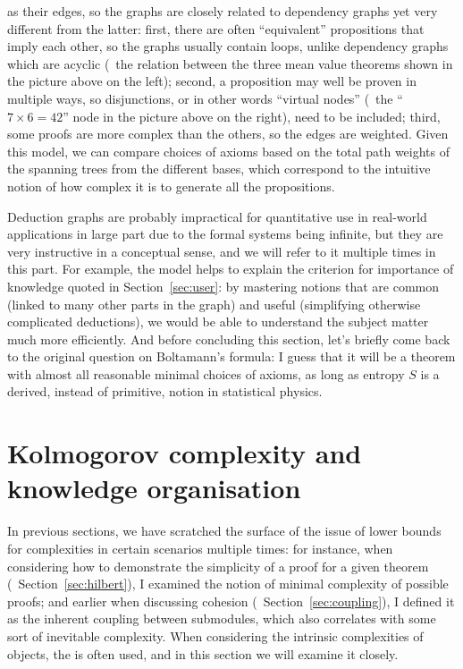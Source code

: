 as their edges, so the graphs are closely related to dependency graphs yet very
different from the latter: first, there are often ``equivalent'' propositions
that imply each other, so the graphs usually contain loops, unlike dependency
graphs which are acyclic (\cf~the relation between the three mean value theorems
shown in the picture above on the left); second, a proposition may well be
proven in multiple ways, so disjunctions, or in other words ``virtual nodes''
(\eg~the ``$7 \times 6 = 42$'' node in the picture above on the right),
need to be included; third, some proofs are more complex than the others,
so the edges are weighted.  Given this model, we can compare choices
of axioms based on the total path weights of the spanning trees from
the different bases, which correspond to the intuitive notion of
how complex it is to generate all the propositions.

Deduction graphs are probably impractical for quantitative use in real-world
applications in large part due to the formal systems being infinite, but they
are very instructive in a conceptual sense, and we will refer to it multiple
times in this part.  For example, the model helps to explain the criterion
for importance of knowledge quoted in Section~\ref{sec:user}: by mastering
notions that are common (linked to many other parts in the graph) and useful
(simplifying otherwise complicated deductions), we would be able to
understand the subject matter much more efficiently.  And before concluding
this section, let's briefly come back to the original question on Boltamann's
formula: I guess that it will be a theorem with almost all reasonable
minimal choices of axioms, as long as entropy $S$ is a derived,
instead of primitive, notion in statistical physics.

\section{Kolmogorov complexity and knowledge organisation}\label{sec:kolmogorov}

In previous sections, we have scratched the surface of the issue of lower
bounds for complexities in certain scenarios multiple times: for instance,
when considering how to demonstrate the simplicity of a proof for a given
theorem (\cf~Section~\ref{sec:hilbert}), I examined the notion of minimal
complexity of possible proofs; and earlier when discussing cohesion
(\cf~Section~\ref{sec:coupling}), I defined it as the inherent coupling
between submodules, which also correlates with some sort of inevitable
complexity.  When considering the intrinsic complexities of objects,
the  is
often used, and in this section we will examine it closely.

